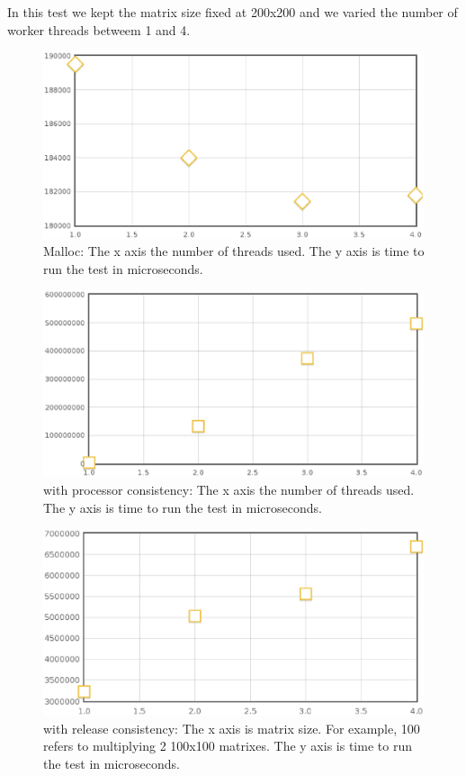 In this test we kept the matrix size fixed at 200x200 and we varied the number of worker threads betweem 1 and 4.

\begin{figure}[!h]
\centering
\includegraphics[scale=0.40]{images/malloc-fixed-matrix.eps}
\caption{Malloc: The x axis the number of threads used. The y axis is time to run the test in microseconds.}
\end{figure}

\begin{figure}[!h]
\centering
\includegraphics[scale=0.40]{images/mmult-lh-fixed-size.eps}
\caption{\projname{} with processor consistency: The x axis the number of threads used. The y axis is time to run the test in microseconds.}
\end{figure}

\begin{figure}[!h]
\centering
\includegraphics[scale=0.40]{images/mmlh-fixed-size.eps}
\caption{\projname{} with release consistency: The x axis is matrix size. For example, 100 refers to multiplying 2 100x100 matrixes. The y axis is time to run the test in microseconds.}
\end{figure}

